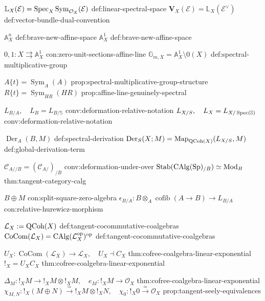 \begin{longtable}
\NotationPair
{\(\mathbb L_X(\mathcal E)=\operatorname{Spec}_X\operatorname{Sym}_{\mathcal O_X}(\mathcal E)\)}
{def:linear-spectral-space}
{\(\mathbf V_X(\mathcal E)=\mathbb L_X(\mathcal E^\vee)\)}
{def:vector-bundle-dual-convention}

\NotationPair
{\(\mathbb A_X^n\)}
{def:brave-new-affine-space}
{\(\mathbb A_X^1\)}
{def:brave-new-affine-space}

\NotationPair
{\(0,1:X\rightrightarrows\mathbb A_X^1\)}
{con:zero-unit-sections-affine-line}
{\(\mathbb G_{m,X}=\mathbb A_X^1\setminus0(X)\)}
{def:spectral-multiplicative-group}

\NotationPair
{\(A\{t\}=\operatorname{Sym}_A(A)\)}
{prop:spectral-multiplicative-group-structure}
{\(R\{t\}=\operatorname{Sym}_{HR}(HR)\)}
{prop:affine-line-genuinely-spectral}



\NotationPair
{\(L_{B/A},\quad L_B=L_{B/\mathbb S}\)}
{conv:deformation-relative-notation}
{\(L_{X/S},\quad L_X=L_{X/\operatorname{Spec}(\mathbb S)}\)}
{conv:deformation-relative-notation}

\NotationPair
{\(\operatorname{Der}_A(B,M)\)}
{def:spectral-derivation}
{\(\operatorname{Der}_S(X;M)=\operatorname{Map}_{\operatorname{QCoh}(X)}(L_{X/S},M)\)}
{def:global-derivation-term}

\NotationPair
{\(\mathcal C_{A//B}=(\mathcal C_{A/})_{/B}\)}
{conv:deformation-under-over}
{\(\operatorname{Stab}(\operatorname{CAlg}(\operatorname{Sp})_{/B})\simeq\operatorname{Mod}_B\)}
{thm:tangent-category-calg}

\NotationPair
{\(B\oplus M\)}
{con:split-square-zero-algebra}
{\(\epsilon_{B/A}:B\otimes_A\operatorname{cofib}(A\to B)\to L_{B/A}\)}
{con:relative-hurewicz-morphism}



\NotationPair
{\(\mathcal L_X:=\operatorname{QCoh}(X)\)}
{def:tangent-cocommutative-coalgebras}
{\(\operatorname{CoCom}(\mathcal L_X)=\operatorname{CAlg}(\mathcal L_X^{\mathrm{op}})^{\mathrm{op}}\)}
{def:tangent-cocommutative-coalgebras}

\NotationPair
{\(U_X:\operatorname{CoCom}(\mathcal L_X)\to\mathcal L_X,\quad U_X\dashv C_X\)}
{thm:cofree-coalgebra-linear-exponential}
{\(!_X=U_XC_X\)}
{thm:cofree-coalgebra-linear-exponential}

\NotationPair
{\(\Delta_M:!_XM\to !_XM\otimes !_XM,\quad e_M:!_XM\to\mathcal O_X\)}
{thm:cofree-coalgebra-linear-exponential}
{\(\chi_{M,N}:!_X(M\oplus N)\xrightarrow{\simeq}!_XM\otimes !_XN,\quad
  \chi_0:!_X0\xrightarrow{\simeq}\mathcal O_X\)}
{prop:tangent-seely-equivalences}


\end{longtable}
